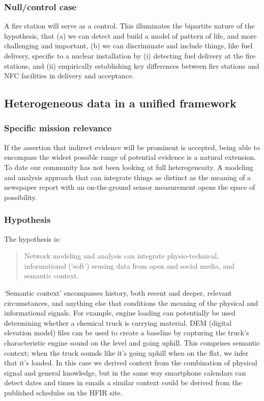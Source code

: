 \documentclass{article} %
\begin{document}
\subsubsection{Null/control case}
A fire station will serve as a control. This illuminates the bipartite nature of the hypothesis, that (a) we can detect and build a model of pattern of life, and more challenging and important, (b) we can discriminate and include things, like fuel delivery, specific to a nuclear installation by (i) detecting fuel delivery at the fire stations, and (ii) empirically establishing key differences between fire stations and NFC facilities in delivery and acceptance.

\pagebreak
\subsection{Heterogeneous data in a unified framework}
\subsubsection{Specific mission relevance}
If the assertion that indirect evidence will be prominent is accepted, being able to encompass the widest possible range of potential evidence is a natural extension. To date our community has not been looking at full heterogeneaity. A modeling and analysis approach that can integrate things as distinct as the meaning of a newspaper report with an on-the-ground sensor measurement opens the space of possibility.

\subsubsection{Hypothesis}
The hypothesis is:
\begin{quote}
Network modeling and analysis can integrate physio-technical, informational (`soft') sensing data from open and social media, and semantic context.
\end{quote}

`Semantic context' encompasses history, both recent and deeper, relevant circumstances, and anything else that conditions the meaning of the physical and informational signals. For example, engine loading can potentially be used determining whether a chemical truck is carrying material. DEM (digital elevation model) files can be used to create a baseline by capturing the truck's characteristic engine sound on the level and going uphill. This comprises semantic context; when the truck sounds like it's going uphill when on the flat, we infer that it's loaded. In this case we derived context from the combination of physical signal and general knowledge, but in the same way smartphone calendars can detect dates and times in emails a similar context could be derived from the published schedules on the HFIR site.
\end{document}
